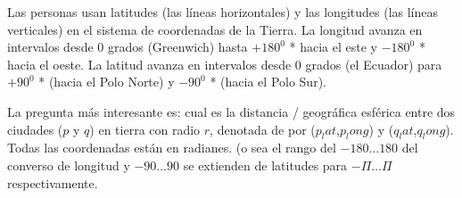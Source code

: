Las personas usan latitudes (las líneas horizontales) y las longitudes (las líneas verticales) en el sistema de coordenadas de la Tierra. La longitud avanza en intervalos desde $0$ grados (Greenwich) hasta $+180^0$ * hacia el este y $-180^0$ * hacia el oeste. La latitud avanza en intervalos desde 0 grados (el Ecuador) para $+90^0$ * (hacia el Polo Norte) y $-90^0$ * (hacia el Polo Sur). 

La pregunta más interesante es: cual es la distancia / geográfica esférica entre  dos ciudades ($p$ y $q$) en tierra con radio $r$, denotada de por ($p_lat$,$p_long$) y ($q_lat$,$q_long$). Todas las coordenadas están en radianes. (o sea el rango del $-180 \dots 180$ del converso de longitud y $-90 \dots 90$ se extienden de latitudes para $-\Pi  \dots \Pi$ respectivamente.